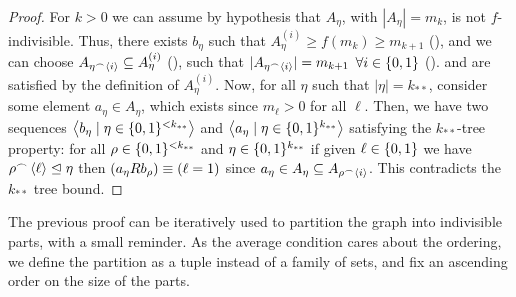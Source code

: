 \begin{lemma}[Claim 4.3]
\begin{proof}
            For $k > 0$ we can assume by hypothesis that $A_\eta$, with $|A_\eta| = m_{k}$, is not $f$-indivisible.
            Thus, there exists $b_\eta$ such that $A_\eta^{(i)} \geq f(m_{k}) \geq m_{k+1}$ (), and we can choose
            $A_{\eta^\frown \left< i \right>} \subseteq A_\eta^{(i)}$ (), such that
            $|A_{\eta^\frown \left< i \right>}| = m_{k+1}$ $\forall i \in \{ 0,1 \}$ ().
             and  are satisfied by the definition of $A_\eta^{(i)}$.
            Now, for all $\eta$ such that $|\eta| = k_{**}$, consider some element $a_\eta \in A_\eta$, which exists since $m_\ell > 0$
            for all $\ell$.
            Then, we have two sequences $\left< b_\eta \mid \eta \in \{ 0,1 \}^{<k_{**}} \right>$ and $\left< a_\eta \mid \eta \in \{ 0,1 \}^{k_{**}} \right>$
            satisfying the $k_{**}$-tree property: for all $\rho \in \{ 0,1 \}^{<k_{**}}$ and $\eta \in \{ 0,1 \}^{k_{**}}$
            if given $\ell \in \{ 0, 1 \}$ we have $\rho^\frown \left< \ell \right> \trianglelefteq \eta$ then
            $(a_\eta R b_\rho) \equiv ( \ell = 1 )$ since $a_\eta \in A_\eta \subseteq A_{\rho ^\frown \left< i \right>}$.
            This contradicts the $k_{**}$ tree bound.
        \end{proof}
    \end{lemma}

    The previous proof can be iteratively used to partition the graph into indivisible parts, with a small reminder.
    As the average condition cares about the ordering, we define the partition as a tuple instead of a family of sets,
    and fix an ascending order on the size of the parts.

